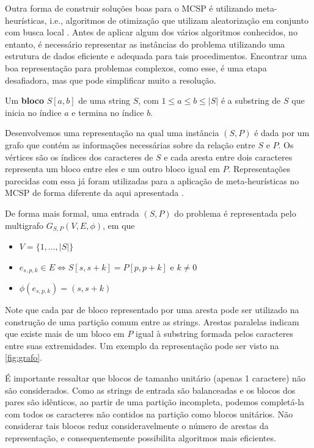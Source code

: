 Outra forma de construir soluções boas para o MCSP é utilizando meta-heurísticas, i.e., algoritmos de otimização que utilizam aleatorização em conjunto com busca local \cite[p.~4]{yang_nature-inspired_2010}. Antes de aplicar algum dos vários algoritmos conhecidos, no entanto, é necessário representar as instâncias do problema utilizando uma estrutura de dados eficiente e adequada para tais procedimentos. Encontrar uma boa representação para problemas complexos, como esse, é uma etapa desafiadora, mas que pode simplificar muito a resolução.

\begin{definition}
    Um \textbf{bloco} $S[a, b]$ de uma string $S$, com $1 \leq a \leq b \leq |S|$ é a substring de $S$ que inicia no índice $a$ e termina no índice $b$.
\end{definition}

Desenvolvemos uma representação na qual uma instância $(S, P)$ é dada por um grafo que contém as informações necessárias sobre da relação entre $S$ e $P$. Os vértices são os índices dos caracteres de $S$ e cada aresta entre dois caracteres representa um bloco entre eles e um outro bloco igual em $P$. Representações parecidas com essa já foram utilizadas para a aplicação de meta-heurísticas no MCSP de forma diferente da aqui apresentada \cite{ferdous_solving_2013}.

De forma mais formal, uma entrada $(S, P)$ do problema é representada pelo multigrafo $G_{S, P}(V, E, \phi)$, em que

\begin{itemize}
    \item $V = \{ 1, ..., |S| \}$
    \item $e_{s, p, k} \in E \iff S[s, s + k] = P[p, p + k] \text{ e } k \neq 0$
    \item $\phi(e_{s, p, k}) = (s, s + k)$
\end{itemize}

Note que cada par de bloco representado por uma aresta pode ser utilizado na construção de uma partição comum entre as strings. Arestas paralelas indicam que existe mais de um bloco em $P$ igual à substring formada pelos caracteres entre suas extremidades. Um exemplo da representação pode ser visto na \cref{fig:grafo}.

É importante ressaltar que blocos de tamanho unitário (apenas 1 caractere) não são considerados. Como as strings de entrada são balanceadas e os blocos dos pares são idênticos, ao partir de uma partição incompleta, podemos completá-la com todos os caracteres não contidos na partição como blocos unitários. Não considerar tais blocos reduz consideravelmente o número de arestas da representação, e consequentemente possibilita algoritmos mais eficientes.

